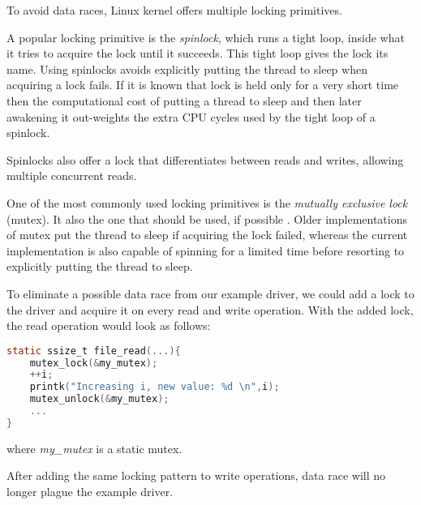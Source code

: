 \documentclass[..thesis.tex]{subfiles}
\begin{document}
To avoid data races, Linux kernel offers multiple locking primitives. 

A popular locking primitive is the \textit{spinlock}, which runs a tight loop, inside what it tries to acquire the lock until it succeeds. This tight loop gives the lock its name. Using spinlocks avoids explicitly putting the thread to sleep when acquiring a lock fails. If it is known that lock is held only for a very short time then the computational cost of putting a thread to sleep and then later awakening it out-weights the extra CPU cycles used by the tight loop of a spinlock.

Spinlocks also offer a lock that differentiates between reads and writes, allowing multiple concurrent reads.

One of the most commonly used locking primitives is the \textit{mutually exclusive lock} (mutex). It also the one that should be used, if possible \cite[Documentation/locking/mutex-design.txt]{torvalds_linux}. Older implementations of mutex put the thread to sleep if acquiring the lock failed, whereas the current implementation is also capable of spinning for a limited time before resorting to explicitly putting the thread to sleep.


To eliminate a possible data race from our example driver, we could add a lock to the driver and acquire it on every read and write operation. With the added lock, the read operation would look as follows:

\begin{lstlisting}[language=C,style=def]
static ssize_t file_read(...){
    mutex_lock(&my_mutex);
    ++i;
    printk("Increasing i, new value: %d \n",i);
    mutex_unlock(&my_mutex);
    ...
}
\end{lstlisting}

where \textit{my\_mutex} is a static mutex.

After adding the same locking pattern to write operations, data race will no longer plague the example driver.

\end{document}
